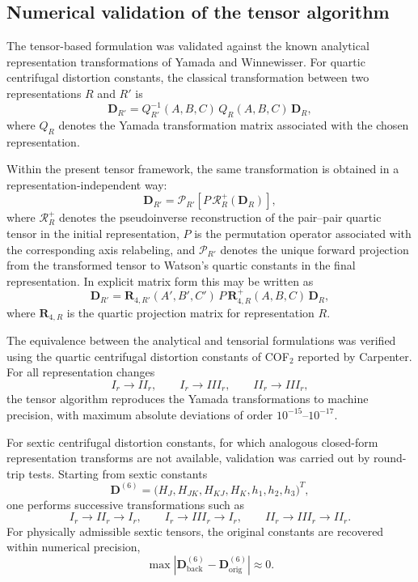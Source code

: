 \subsection{Numerical validation of the tensor algorithm}

The tensor-based formulation was validated against the known analytical
representation transformations of Yamada and
Winnewisser.\cite{Yamada1976}  For quartic centrifugal distortion constants, the
classical transformation between two representations $R$ and $R'$ is
\begin{equation}
\mathbf{D}_{R'} =
Q_{R'}^{-1}(A,B,C)\,Q_R(A,B,C)\,\mathbf{D}_R ,
\end{equation}
where $Q_R$ denotes the Yamada transformation matrix associated with the chosen
representation.

Within the present tensor framework, the same transformation is obtained in a
representation-independent way:
\begin{equation}
\mathbf{D}_{R'}
=
\mathcal P_{R'}\!\left[
P\,\mathcal R_R^{+}(\mathbf D_R)
\right],
\label{eq:quartic_tensor_transform}
\end{equation}
where $\mathcal R_R^{+}$ denotes the pseudoinverse reconstruction of the
pair--pair quartic tensor in the initial representation, $P$ is the permutation
operator associated with the corresponding axis relabeling, and $\mathcal P_{R'}$
denotes the unique forward projection from the transformed tensor to Watson's
quartic constants in the final representation.  In explicit matrix form this
may be written as
\begin{equation}
\mathbf D_{R'}=
\mathbf R_{4,R'}(A',B',C')\,
P\,
\mathbf R_{4,R}^{+}(A,B,C)\,
\mathbf D_R,
\end{equation}
where $\mathbf R_{4,R}$ is the quartic projection matrix for representation $R$.

The equivalence between the analytical and tensorial formulations was verified
using the quartic centrifugal distortion constants of COF$_2$ reported by
Carpenter.  For all representation changes
\[
I_r \rightarrow II_r,\qquad
I_r \rightarrow III_r,\qquad
II_r \rightarrow III_r,
\]
the tensor algorithm reproduces the Yamada transformations to machine
precision, with maximum absolute deviations of order
$10^{-15}$--$10^{-17}$.

For sextic centrifugal distortion constants, for which analogous closed-form
representation transforms are not available, validation was carried out by
round-trip tests.  Starting from sextic constants
\[
\mathbf D^{(6)}=
\bigl(
H_J,H_{JK},H_{KJ},H_K,h_1,h_2,h_3
\bigr)^T,
\]
one performs successive transformations such as
\[
I_r \rightarrow II_r \rightarrow I_r,\qquad
I_r \rightarrow III_r \rightarrow I_r,\qquad
II_r \rightarrow III_r \rightarrow II_r.
\]
For physically admissible sextic tensors, the original constants are recovered
within numerical precision,
\begin{equation}
\max |\mathbf D^{(6)}_{\mathrm{back}}-\mathbf D^{(6)}_{\mathrm{orig}}|
\approx 0.
\end{equation}

